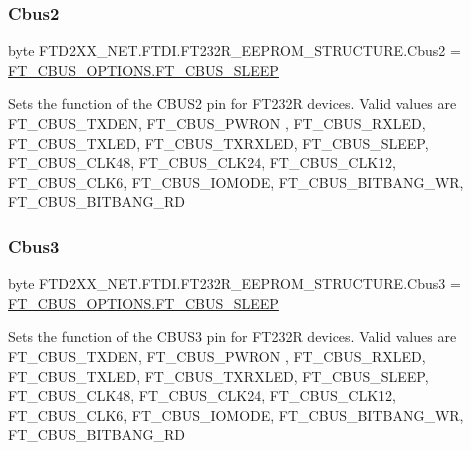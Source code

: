 \subsubsection{\texorpdfstring{Cbus2}{Cbus2}}
{\footnotesize\ttfamily byte F\+T\+D2\+X\+X\+\_\+\+N\+E\+T.\+F\+T\+D\+I.\+F\+T232\+R\+\_\+\+E\+E\+P\+R\+O\+M\+\_\+\+S\+T\+R\+U\+C\+T\+U\+R\+E.\+Cbus2 = \mbox{\hyperlink{class_f_t_d2_x_x___n_e_t_1_1_f_t_d_i_1_1_f_t___c_b_u_s___o_p_t_i_o_n_s_a12ffdb96c52abef0df44530b144b0a80}{F\+T\+\_\+\+C\+B\+U\+S\+\_\+\+O\+P\+T\+I\+O\+N\+S.\+F\+T\+\_\+\+C\+B\+U\+S\+\_\+\+S\+L\+E\+EP}}}



Sets the function of the C\+B\+U\+S2 pin for F\+T232R devices. Valid values are F\+T\+\_\+\+C\+B\+U\+S\+\_\+\+T\+X\+D\+EN, F\+T\+\_\+\+C\+B\+U\+S\+\_\+\+P\+W\+R\+ON , F\+T\+\_\+\+C\+B\+U\+S\+\_\+\+R\+X\+L\+ED, F\+T\+\_\+\+C\+B\+U\+S\+\_\+\+T\+X\+L\+ED, F\+T\+\_\+\+C\+B\+U\+S\+\_\+\+T\+X\+R\+X\+L\+ED, F\+T\+\_\+\+C\+B\+U\+S\+\_\+\+S\+L\+E\+EP, F\+T\+\_\+\+C\+B\+U\+S\+\_\+\+C\+L\+K48, F\+T\+\_\+\+C\+B\+U\+S\+\_\+\+C\+L\+K24, F\+T\+\_\+\+C\+B\+U\+S\+\_\+\+C\+L\+K12, F\+T\+\_\+\+C\+B\+U\+S\+\_\+\+C\+L\+K6, F\+T\+\_\+\+C\+B\+U\+S\+\_\+\+I\+O\+M\+O\+DE, F\+T\+\_\+\+C\+B\+U\+S\+\_\+\+B\+I\+T\+B\+A\+N\+G\+\_\+\+WR, F\+T\+\_\+\+C\+B\+U\+S\+\_\+\+B\+I\+T\+B\+A\+N\+G\+\_\+\+RD 

\mbox{\label{class_f_t_d2_x_x___n_e_t_1_1_f_t_d_i_1_1_f_t232_r___e_e_p_r_o_m___s_t_r_u_c_t_u_r_e_a9573c46f9faa3c896443396b170ed24b}} 
\subsubsection{\texorpdfstring{Cbus3}{Cbus3}}
{\footnotesize\ttfamily byte F\+T\+D2\+X\+X\+\_\+\+N\+E\+T.\+F\+T\+D\+I.\+F\+T232\+R\+\_\+\+E\+E\+P\+R\+O\+M\+\_\+\+S\+T\+R\+U\+C\+T\+U\+R\+E.\+Cbus3 = \mbox{\hyperlink{class_f_t_d2_x_x___n_e_t_1_1_f_t_d_i_1_1_f_t___c_b_u_s___o_p_t_i_o_n_s_a12ffdb96c52abef0df44530b144b0a80}{F\+T\+\_\+\+C\+B\+U\+S\+\_\+\+O\+P\+T\+I\+O\+N\+S.\+F\+T\+\_\+\+C\+B\+U\+S\+\_\+\+S\+L\+E\+EP}}}



Sets the function of the C\+B\+U\+S3 pin for F\+T232R devices. Valid values are F\+T\+\_\+\+C\+B\+U\+S\+\_\+\+T\+X\+D\+EN, F\+T\+\_\+\+C\+B\+U\+S\+\_\+\+P\+W\+R\+ON , F\+T\+\_\+\+C\+B\+U\+S\+\_\+\+R\+X\+L\+ED, F\+T\+\_\+\+C\+B\+U\+S\+\_\+\+T\+X\+L\+ED, F\+T\+\_\+\+C\+B\+U\+S\+\_\+\+T\+X\+R\+X\+L\+ED, F\+T\+\_\+\+C\+B\+U\+S\+\_\+\+S\+L\+E\+EP, F\+T\+\_\+\+C\+B\+U\+S\+\_\+\+C\+L\+K48, F\+T\+\_\+\+C\+B\+U\+S\+\_\+\+C\+L\+K24, F\+T\+\_\+\+C\+B\+U\+S\+\_\+\+C\+L\+K12, F\+T\+\_\+\+C\+B\+U\+S\+\_\+\+C\+L\+K6, F\+T\+\_\+\+C\+B\+U\+S\+\_\+\+I\+O\+M\+O\+DE, F\+T\+\_\+\+C\+B\+U\+S\+\_\+\+B\+I\+T\+B\+A\+N\+G\+\_\+\+WR, F\+T\+\_\+\+C\+B\+U\+S\+\_\+\+B\+I\+T\+B\+A\+N\+G\+\_\+\+RD 


